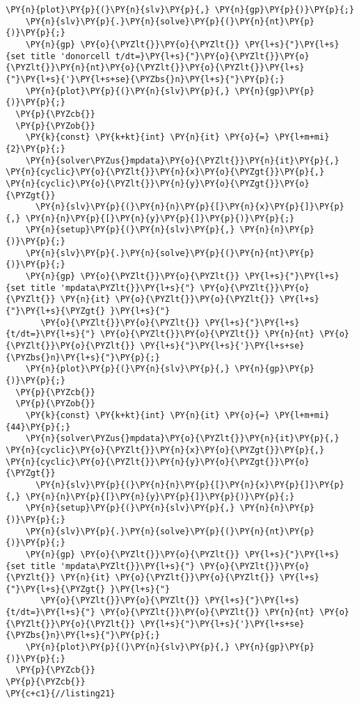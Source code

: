 \begin{Verbatim}[commandchars=\\\{\}]
    \PY{n}{plot}\PY{p}{(}\PY{n}{slv}\PY{p}{,} \PY{n}{gp}\PY{p}{)}\PY{p}{;}
    \PY{n}{slv}\PY{p}{.}\PY{n}{solve}\PY{p}{(}\PY{n}{nt}\PY{p}{)}\PY{p}{;}
    \PY{n}{gp} \PY{o}{\PYZlt{}}\PY{o}{\PYZlt{}} \PY{l+s}{"}\PY{l+s}{set title 'donorcell t/dt=}\PY{l+s}{"}\PY{o}{\PYZlt{}}\PY{o}{\PYZlt{}}\PY{n}{nt}\PY{o}{\PYZlt{}}\PY{o}{\PYZlt{}}\PY{l+s}{"}\PY{l+s}{'}\PY{l+s+se}{\PYZbs{}n}\PY{l+s}{"}\PY{p}{;}
    \PY{n}{plot}\PY{p}{(}\PY{n}{slv}\PY{p}{,} \PY{n}{gp}\PY{p}{)}\PY{p}{;}
  \PY{p}{\PYZcb{}} 
  \PY{p}{\PYZob{}}
    \PY{k}{const} \PY{k+kt}{int} \PY{n}{it} \PY{o}{=} \PY{l+m+mi}{2}\PY{p}{;}
    \PY{n}{solver\PYZus{}mpdata}\PY{o}{\PYZlt{}}\PY{n}{it}\PY{p}{,} \PY{n}{cyclic}\PY{o}{\PYZlt{}}\PY{n}{x}\PY{o}{\PYZgt{}}\PY{p}{,} \PY{n}{cyclic}\PY{o}{\PYZlt{}}\PY{n}{y}\PY{o}{\PYZgt{}}\PY{o}{\PYZgt{}} 
      \PY{n}{slv}\PY{p}{(}\PY{n}{n}\PY{p}{[}\PY{n}{x}\PY{p}{]}\PY{p}{,} \PY{n}{n}\PY{p}{[}\PY{n}{y}\PY{p}{]}\PY{p}{)}\PY{p}{;} 
    \PY{n}{setup}\PY{p}{(}\PY{n}{slv}\PY{p}{,} \PY{n}{n}\PY{p}{)}\PY{p}{;} 
    \PY{n}{slv}\PY{p}{.}\PY{n}{solve}\PY{p}{(}\PY{n}{nt}\PY{p}{)}\PY{p}{;}
    \PY{n}{gp} \PY{o}{\PYZlt{}}\PY{o}{\PYZlt{}} \PY{l+s}{"}\PY{l+s}{set title 'mpdata\PYZlt{}}\PY{l+s}{"} \PY{o}{\PYZlt{}}\PY{o}{\PYZlt{}} \PY{n}{it} \PY{o}{\PYZlt{}}\PY{o}{\PYZlt{}} \PY{l+s}{"}\PY{l+s}{\PYZgt{} }\PY{l+s}{"}
       \PY{o}{\PYZlt{}}\PY{o}{\PYZlt{}} \PY{l+s}{"}\PY{l+s}{t/dt=}\PY{l+s}{"} \PY{o}{\PYZlt{}}\PY{o}{\PYZlt{}} \PY{n}{nt} \PY{o}{\PYZlt{}}\PY{o}{\PYZlt{}} \PY{l+s}{"}\PY{l+s}{'}\PY{l+s+se}{\PYZbs{}n}\PY{l+s}{"}\PY{p}{;}
    \PY{n}{plot}\PY{p}{(}\PY{n}{slv}\PY{p}{,} \PY{n}{gp}\PY{p}{)}\PY{p}{;}
  \PY{p}{\PYZcb{}} 
  \PY{p}{\PYZob{}}
    \PY{k}{const} \PY{k+kt}{int} \PY{n}{it} \PY{o}{=} \PY{l+m+mi}{44}\PY{p}{;}
    \PY{n}{solver\PYZus{}mpdata}\PY{o}{\PYZlt{}}\PY{n}{it}\PY{p}{,} \PY{n}{cyclic}\PY{o}{\PYZlt{}}\PY{n}{x}\PY{o}{\PYZgt{}}\PY{p}{,} \PY{n}{cyclic}\PY{o}{\PYZlt{}}\PY{n}{y}\PY{o}{\PYZgt{}}\PY{o}{\PYZgt{}} 
      \PY{n}{slv}\PY{p}{(}\PY{n}{n}\PY{p}{[}\PY{n}{x}\PY{p}{]}\PY{p}{,} \PY{n}{n}\PY{p}{[}\PY{n}{y}\PY{p}{]}\PY{p}{)}\PY{p}{;} 
    \PY{n}{setup}\PY{p}{(}\PY{n}{slv}\PY{p}{,} \PY{n}{n}\PY{p}{)}\PY{p}{;} 
    \PY{n}{slv}\PY{p}{.}\PY{n}{solve}\PY{p}{(}\PY{n}{nt}\PY{p}{)}\PY{p}{;} 
    \PY{n}{gp} \PY{o}{\PYZlt{}}\PY{o}{\PYZlt{}} \PY{l+s}{"}\PY{l+s}{set title 'mpdata\PYZlt{}}\PY{l+s}{"} \PY{o}{\PYZlt{}}\PY{o}{\PYZlt{}} \PY{n}{it} \PY{o}{\PYZlt{}}\PY{o}{\PYZlt{}} \PY{l+s}{"}\PY{l+s}{\PYZgt{} }\PY{l+s}{"}
       \PY{o}{\PYZlt{}}\PY{o}{\PYZlt{}} \PY{l+s}{"}\PY{l+s}{t/dt=}\PY{l+s}{"} \PY{o}{\PYZlt{}}\PY{o}{\PYZlt{}} \PY{n}{nt} \PY{o}{\PYZlt{}}\PY{o}{\PYZlt{}} \PY{l+s}{"}\PY{l+s}{'}\PY{l+s+se}{\PYZbs{}n}\PY{l+s}{"}\PY{p}{;}
    \PY{n}{plot}\PY{p}{(}\PY{n}{slv}\PY{p}{,} \PY{n}{gp}\PY{p}{)}\PY{p}{;}
  \PY{p}{\PYZcb{}}
\PY{p}{\PYZcb{}}
\PY{c+c1}{//listing21}
\end{Verbatim}
